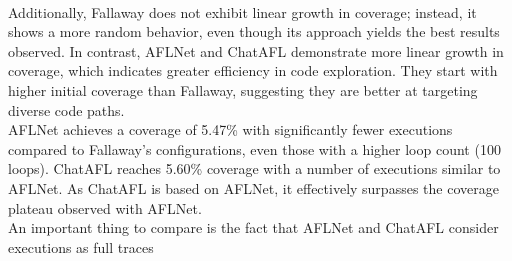 \\Additionally, Fallaway does not exhibit linear growth in coverage; instead, it shows a more random behavior, even though its approach yields the best results observed. In contrast, AFLNet and ChatAFL demonstrate more linear growth in coverage, which indicates greater efficiency in code exploration. They start with higher initial coverage than Fallaway, suggesting they are better at targeting diverse code paths.
\\AFLNet achieves a coverage of 5.47\% with significantly fewer executions compared to Fallaway’s configurations, even those with a higher loop count (100 loops). ChatAFL reaches 5.60\% coverage with a number of executions similar to AFLNet. As ChatAFL is based on AFLNet, it effectively surpasses the coverage plateau observed with AFLNet.
\\An important thing to compare is the fact that AFLNet and ChatAFL consider executions as full traces
